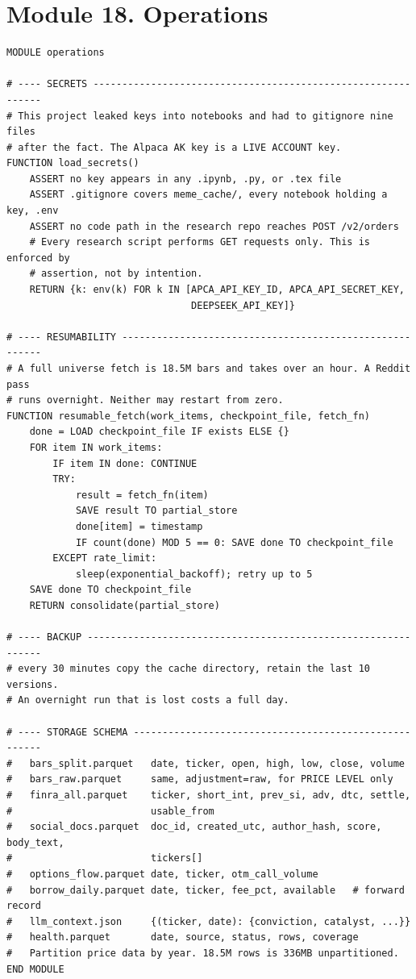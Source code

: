 \documentclass[10pt]{article}
\begin{document}
\section{Module 18. Operations}

\begin{lstlisting}
MODULE operations

# ---- SECRETS -------------------------------------------------------------
# This project leaked keys into notebooks and had to gitignore nine files
# after the fact. The Alpaca AK key is a LIVE ACCOUNT key.
FUNCTION load_secrets()
    ASSERT no key appears in any .ipynb, .py, or .tex file
    ASSERT .gitignore covers meme_cache/, every notebook holding a key, .env
    ASSERT no code path in the research repo reaches POST /v2/orders
    # Every research script performs GET requests only. This is enforced by
    # assertion, not by intention.
    RETURN {k: env(k) FOR k IN [APCA_API_KEY_ID, APCA_API_SECRET_KEY,
                                DEEPSEEK_API_KEY]}

# ---- RESUMABILITY --------------------------------------------------------
# A full universe fetch is 18.5M bars and takes over an hour. A Reddit pass
# runs overnight. Neither may restart from zero.
FUNCTION resumable_fetch(work_items, checkpoint_file, fetch_fn)
    done = LOAD checkpoint_file IF exists ELSE {}
    FOR item IN work_items:
        IF item IN done: CONTINUE
        TRY:
            result = fetch_fn(item)
            SAVE result TO partial_store
            done[item] = timestamp
            IF count(done) MOD 5 == 0: SAVE done TO checkpoint_file
        EXCEPT rate_limit:
            sleep(exponential_backoff); retry up to 5
    SAVE done TO checkpoint_file
    RETURN consolidate(partial_store)

# ---- BACKUP --------------------------------------------------------------
# every 30 minutes copy the cache directory, retain the last 10 versions.
# An overnight run that is lost costs a full day.

# ---- STORAGE SCHEMA ------------------------------------------------------
#   bars_split.parquet   date, ticker, open, high, low, close, volume
#   bars_raw.parquet     same, adjustment=raw, for PRICE LEVEL only
#   finra_all.parquet    ticker, short_int, prev_si, adv, dtc, settle,
#                        usable_from
#   social_docs.parquet  doc_id, created_utc, author_hash, score, body_text,
#                        tickers[]
#   options_flow.parquet date, ticker, otm_call_volume
#   borrow_daily.parquet date, ticker, fee_pct, available   # forward record
#   llm_context.json     {(ticker, date): {conviction, catalyst, ...}}
#   health.parquet       date, source, status, rows, coverage
#   Partition price data by year. 18.5M rows is 336MB unpartitioned.
END MODULE
\end{lstlisting}
\end{document}
